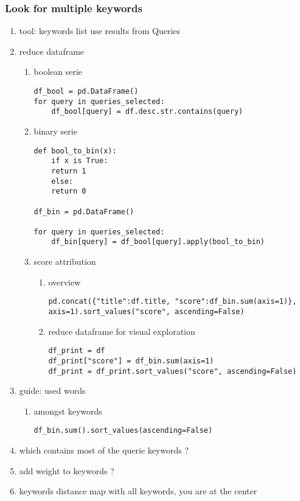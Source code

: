 \documentclass[11pt]{article}
\begin{document}
\subsubsection{Look for multiple keywords}
\label{sec:orgaa2ed6e}
\begin{enumerate}
\item tool: keywords list
\label{sec:org683d9e5}
use results from Queries
\item reduce dataframe
\label{sec:org29a27ae}
\begin{enumerate}
\item boolean serie
\label{sec:orga60c44d}
\begin{verbatim}
df_bool = pd.DataFrame()
for query in queries_selected:
    df_bool[query] = df.desc.str.contains(query)
\end{verbatim}

\item binary serie
\label{sec:org1b67522}
\begin{verbatim}
def bool_to_bin(x):
    if x is True:
	return 1
    else:
	return 0

df_bin = pd.DataFrame()

for query in queries_selected:
    df_bin[query] = df_bool[query].apply(bool_to_bin)
\end{verbatim}

\item score attribution
\label{sec:org454e4c6}

\begin{enumerate}
\item overview
\label{sec:org9571990}
\begin{verbatim}
pd.concat({"title":df.title, "score":df_bin.sum(axis=1)}, axis=1).sort_values("score", ascending=False)
\end{verbatim}

\item reduce dataframe for visual exploration
\label{sec:orgedde591}
\begin{verbatim}
df_print = df
df_print["score"] = df_bin.sum(axis=1)
df_print = df_print.sort_values("score", ascending=False)
\end{verbatim}
\end{enumerate}
\end{enumerate}

\item guide: used words
\label{sec:org2f64c5c}
\begin{enumerate}
\item amongst keywords
\label{sec:org0068f76}
\begin{verbatim}
df_bin.sum().sort_values(ascending=False)
\end{verbatim}
\end{enumerate}

\item which contains most of the querie keywords ?
\label{sec:org6a8109b}
\item add weight to keywords ?
\label{sec:orga82bb86}
\item keywords distance map
\label{sec:org74e0c6c}
with all keywords, you are at the center
\end{enumerate}
\end{document}
